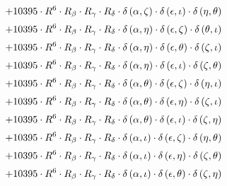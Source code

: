 \begin{subequations}
\begin{gather}
 \\[0.2em] \notag 		 + 10395 \cdot R^{6} \cdot R_{\beta{}} \cdot R_{\gamma{}} \cdot R_{\delta{}} \cdot \delta{}\left(\alpha{}, \zeta{}\right) \cdot \delta{}\left(\epsilon{}, \iota{}\right) \cdot \delta{}\left(\eta{}, \theta{}\right) 
 \\[0.2em] \notag 		 + 10395 \cdot R^{6} \cdot R_{\beta{}} \cdot R_{\gamma{}} \cdot R_{\delta{}} \cdot \delta{}\left(\alpha{}, \eta{}\right) \cdot \delta{}\left(\epsilon{}, \zeta{}\right) \cdot \delta{}\left(\theta{}, \iota{}\right) 
 \\[0.2em] \notag 		 + 10395 \cdot R^{6} \cdot R_{\beta{}} \cdot R_{\gamma{}} \cdot R_{\delta{}} \cdot \delta{}\left(\alpha{}, \eta{}\right) \cdot \delta{}\left(\epsilon{}, \theta{}\right) \cdot \delta{}\left(\zeta{}, \iota{}\right) 
 \\[0.2em] \notag 		 + 10395 \cdot R^{6} \cdot R_{\beta{}} \cdot R_{\gamma{}} \cdot R_{\delta{}} \cdot \delta{}\left(\alpha{}, \eta{}\right) \cdot \delta{}\left(\epsilon{}, \iota{}\right) \cdot \delta{}\left(\zeta{}, \theta{}\right) 
 \\[0.2em] \notag 		 + 10395 \cdot R^{6} \cdot R_{\beta{}} \cdot R_{\gamma{}} \cdot R_{\delta{}} \cdot \delta{}\left(\alpha{}, \theta{}\right) \cdot \delta{}\left(\epsilon{}, \zeta{}\right) \cdot \delta{}\left(\eta{}, \iota{}\right) 
 \\[0.2em] \notag 		 + 10395 \cdot R^{6} \cdot R_{\beta{}} \cdot R_{\gamma{}} \cdot R_{\delta{}} \cdot \delta{}\left(\alpha{}, \theta{}\right) \cdot \delta{}\left(\epsilon{}, \eta{}\right) \cdot \delta{}\left(\zeta{}, \iota{}\right) 
 \\[0.2em] \notag 		 + 10395 \cdot R^{6} \cdot R_{\beta{}} \cdot R_{\gamma{}} \cdot R_{\delta{}} \cdot \delta{}\left(\alpha{}, \theta{}\right) \cdot \delta{}\left(\epsilon{}, \iota{}\right) \cdot \delta{}\left(\zeta{}, \eta{}\right) 
 \\[0.2em] \notag 		 + 10395 \cdot R^{6} \cdot R_{\beta{}} \cdot R_{\gamma{}} \cdot R_{\delta{}} \cdot \delta{}\left(\alpha{}, \iota{}\right) \cdot \delta{}\left(\epsilon{}, \zeta{}\right) \cdot \delta{}\left(\eta{}, \theta{}\right) 
 \\[0.2em] \notag 		 + 10395 \cdot R^{6} \cdot R_{\beta{}} \cdot R_{\gamma{}} \cdot R_{\delta{}} \cdot \delta{}\left(\alpha{}, \iota{}\right) \cdot \delta{}\left(\epsilon{}, \eta{}\right) \cdot \delta{}\left(\zeta{}, \theta{}\right) 
 \\[0.2em] \notag 		 + 10395 \cdot R^{6} \cdot R_{\beta{}} \cdot R_{\gamma{}} \cdot R_{\delta{}} \cdot \delta{}\left(\alpha{}, \iota{}\right) \cdot \delta{}\left(\epsilon{}, \theta{}\right) \cdot \delta{}\left(\zeta{}, \eta{}\right) 

\end{gather}
\end{subequations}
